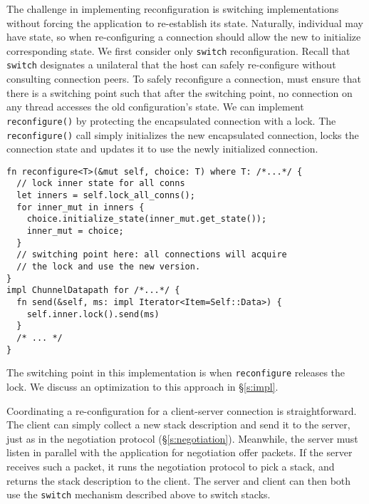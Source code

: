 \begin{outline}
\1 The challenge in implementing reconfiguration is switching implementations without forcing the application to re-establish its state. Naturally, individual \tunnels may have state, so when re-configuring a connection \name should allow the new \tunnel to initialize corresponding state.
\1 We first consider only \texttt{switch} reconfiguration. Recall that \texttt{switch} designates a unilateral \tunnel that the host can safely re-configure without consulting connection peers.
\1 To safely reconfigure a connection, \name must ensure that there is a switching point such that after the switching point, no connection on any thread accesses the old configuration's state.
\1 We can implement \texttt{reconfigure()} by protecting the encapsulated connection with a lock. The \texttt{reconfigure()} call simply initializes the new encapsulated connection, locks the connection state and updates it to use the newly initialized connection.
\begin{verbatim}
fn reconfigure<T>(&mut self, choice: T) where T: /*...*/ {
  // lock inner state for all conns
  let inners = self.lock_all_conns();
  for inner_mut in inners {
    choice.initialize_state(inner_mut.get_state());
    inner_mut = choice;
  }
  // switching point here: all connections will acquire 
  // the lock and use the new version.
}
impl ChunnelDatapath for /*...*/ {
  fn send(&self, ms: impl Iterator<Item=Self::Data>) { 
    self.inner.lock().send(ms)
  }
  /* ... */
}
\end{verbatim}
  \2 The switching point in this implementation is when \texttt{reconfigure} releases the lock.
  \2 We discuss an optimization to this approach in \S\ref{s:impl}.
\end{outline}

\begin{outline}
  \1 Coordinating a re-configuration for a client-server connection is straightforward. The client can simply collect a new \tunnel stack description and send it to the server, just as in the negotiation protocol (\S\ref{s:negotiation}).
  \1 Meanwhile, the server must listen in parallel with the application for negotiation offer packets. 
    \2 If the server receives such a packet, it runs the negotiation protocol to pick a \tunnel stack, and returns the stack description to the client.
  \1 The server and client can then both use the \texttt{switch} mechanism described above to switch \tunnel stacks.
\end{outline}

